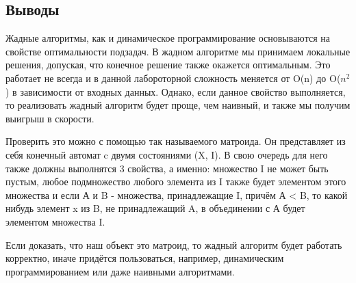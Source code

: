 \documentclass[12pt]{article}
\begin{document}
\subsection*{Выводы}

Жадные алгоритмы, как и динамическое программирование основываются на свойстве оптимальности подзадач. В жадном алгоритме мы принимаем локальные решения, допуская, что конечное решение также окажется оптимальным. Это работает не всегда и в данной лабороторной сложность меняется от O(n) до O($n^2$) в зависимости от входных данных. Однако, если данное свойство выполняется, то реализовать жадный алгоритм будет проще, чем наивный, и также мы получим выигрыш в скорости. 

Проверить это можно с помощью так называемого матроида. Он представляет из себя конечный автомат c двумя состояниями (X, I). В свою очередь для него также должны выполнятся 3 свойства, а именно: множество I не может быть пустым, любое подмножество любого элемента из I также будет элементом этого множества и если А и B - множества, принадлежащие I, причём А < B, то какой нибудь элемент x из B, не принадлежащий A, в объединении с А будет элементом множества I.

Если доказать, что наш объект это матроид, то жадный алгоритм будет работать корректно, иначе придётся пользоваться, например, динамическим программированием или даже наивными алгоритмами.
\end{document}
